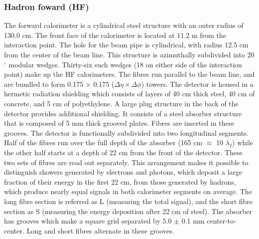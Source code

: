 \subsubsection{Hadron foward (HF)}
The forward calorimeter is a cylindrical steel structure with an outer radius of 130.0 cm. The front face of the calorimeter is located at 11.2 m from the interaction point. The hole for the beam pipe is cylindrical, with radius 12.5 cm from the center of the beam line. This structure is azimuthally subdivided into 20$^\circ$ modular wedges. Thirty-six such wedges (18 on either side of the interaction point) make up the HF calorimeters. The fibres run parallel to the beam line, and are bundled to form 0.175 $\times$ 0.175 ($\Delta \eta  \times \Delta \phi$) towers. The detector is housed in a hermetic radiation shielding which consists of layers of 40 cm thick steel, 40 cm of concrete, and 5 cm of polyethylene. A large plug structure in the back of the detector provides additional shielding. It consists of a steel absorber structure that is composed of 5 mm thick grooved plates. Fibres are inserted in these grooves. The detector is functionally subdivided into two longitudinal segments. Half of the fibres run over the full depth of the absorber (165 cm $\approx$ 10 $\lambda_{I}$) while the other half starts at a depth of 22 cm from the front of the detector. These two sets of fibres are read out separately. This arrangement makes it possible to distinguish showers generated by electrons and photons, which deposit a large fraction of their energy in the first 22 cm, from those generated by hadrons, which produce nearly equal signals in both calorimeter segments on average. The long fibre section is referred as L (measuring the total signal), and the short fibre section as S (measuring the energy deposition after 22 cm of steel). The absorber has grooves which make a square grid separated by 5.0 $\pm$ 0.1 mm center-to-center. Long and short fibres alternate in these grooves. 

